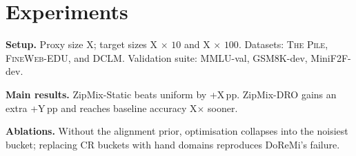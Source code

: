 \section{Experiments}\label{sec:experiments}
\textbf{Setup.} Proxy size X; target sizes X$\,\times\,10$ and X$\,\times\,100$.
Datasets: \textsc{The Pile}, \textsc{FineWeb-EDU}, and \textsc{DCLM}.
Validation suite: MMLU-val, GSM8K-dev, MiniF2F-dev.

\textbf{Main results.} ZipMix-Static beats uniform by +X\,pp.
ZipMix-DRO gains an extra +Y\,pp and reaches baseline accuracy X$\times$ sooner.

\textbf{Ablations.} Without the alignment prior, optimisation collapses into the noisiest bucket; replacing CR buckets with hand domains reproduces DoReMi's failure.

